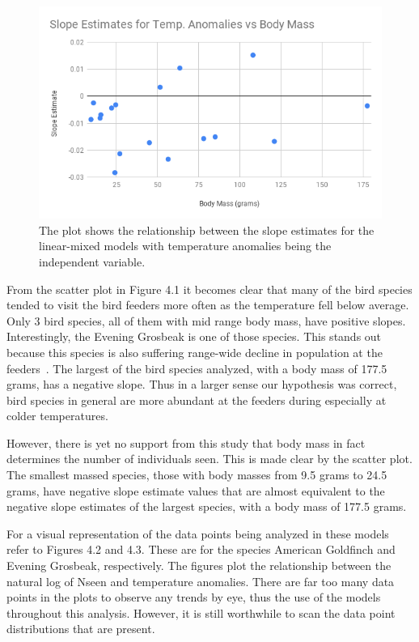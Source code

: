 \begin{figure}[h]
\centering
\includegraphics[width=1.0\textwidth]{figures/tempScaledvsBodyMass.png}
\caption{The plot shows the relationship between the slope estimates for the linear-mixed models with temperature anomalies being the independent variable.}
\end{figure}

From the scatter plot in Figure 4.1 it becomes clear that many of the bird species tended to visit the bird feeders more often as the temperature fell below average. Only 3 bird species, all of them with mid range body mass, have positive slopes. Interestingly, the Evening Grosbeak is one of those species. This stands out because this species is also suffering range-wide decline in population at the feeders~\cite{bonter2008winter}. The largest of the bird species analyzed, with a body mass of 177.5 grams, has a negative slope. Thus in a larger sense our hypothesis was correct, bird species in general are more abundant at the feeders during especially at colder temperatures.  

However, there is yet no support from this study that body mass in fact determines the number of individuals seen. This is made clear by the scatter plot. The smallest massed species, those with body masses from 9.5 grams to 24.5 grams, have negative slope estimate values that are almost equivalent to the negative slope estimates of the largest species, with a body mass of 177.5 grams.

For a visual representation of the data points being analyzed in these models refer to Figures 4.2 and 4.3. These are for the species American Goldfinch and Evening Grosbeak, respectively. The figures plot the relationship between the natural log of Nseen and temperature anomalies. There are far too many data points in the plots to observe any trends by eye, thus the use of the models throughout this analysis. However, it is still worthwhile to scan the data point distributions that are present.

